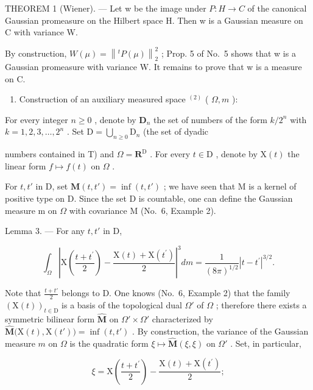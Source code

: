 THEOREM 1 (Wiener). --- Let w be the image under \(P: H \to C\) of the canonical Gaussian promeasure on the Hilbert space H. Then w is a Gaussian measure on C with variance W.

By construction, \(W(\mu) = \left\|^{t} P(\mu) \right\|_{2}^{2}\) ; Prop. 5 of No.~5 shows that w is a Gaussian promeasure with variance W. It remains to prove that w is a measure on C.

\begin{enumerate}
\def\labelenumi{\Alph{enumi})}
\tightlist
\item
  Construction of an auxiliary measured space \(^{(2)}\) ( \(\Omega, m\) ):
\end{enumerate}

For every integer \(n \geqslant 0\) , denote by \(\mathbf{D}_n\) the set of numbers of the form \(k / 2^n\) with \(k = 1, 2, 3, \ldots, 2^n\) . Set \(\mathrm{D} = \bigcup_{n \geqslant 0} \mathrm{D}_n\) (the set of dyadic

numbers contained in T) and \(\Omega = \mathbf{R}^{\mathrm{D}}\) . For every \(t \in \mathrm{D}\) , denote by \(\mathrm{X}(t)\) the linear form \(f \mapsto f(t)\) on \(\Omega\) .

For \(t, t'\) in D, set \(\mathbf{M}(t, t') = \inf(t, t')\) ; we have seen that M is a kernel of positive type on D. Since the set D is countable, one can define the Gaussian measure m on \(\Omega\) with covariance M (No.~6, Example 2).

Lemma 3. --- For any \(t, t'\) in D,

\[
\int_ {\Omega} \left| \mathrm{X} \left(\frac {t + t ^ {\prime}}{2}\right) - \frac {\mathrm{X} (t) + \mathrm{X} \left(t ^ {\prime}\right)}{2} \right| ^ {3} d m = \frac {1}{(8 \pi) ^ {1 / 2}} | t - t ^ {\prime} | ^ {3 / 2}.\tag{38}
\]

Note that \(\frac{t + t'}{2}\) belongs to D. One knows (No.~6, Example 2) that the family \(\left(\mathrm{X}(t)\right)_{t\in \mathrm{D}}\) is a basis of the topological dual \(\Omega'\) of \(\Omega\) ; therefore there exists a symmetric bilinear form \(\widehat{\mathbf{M}}\) on \(\Omega' \times \Omega'\) characterized by \(\widehat{\mathbf{M}}\big(\mathrm{X}(t),\mathrm{X}(t')\big) = \inf(t,t')\) . By construction, the variance of the Gaussian measure \(m\) on \(\Omega\) is the quadratic form \(\xi \mapsto \widehat{\mathbf{M}}(\xi ,\xi)\) on \(\Omega'\) . Set, in particular,

\[
\xi = \mathrm{X} \left(\frac {t + t ^ {\prime}}{2}\right) - \frac {\mathrm{X} (t) + \mathrm{X} (t ^ {\prime})}{2};\tag{39}
\]

